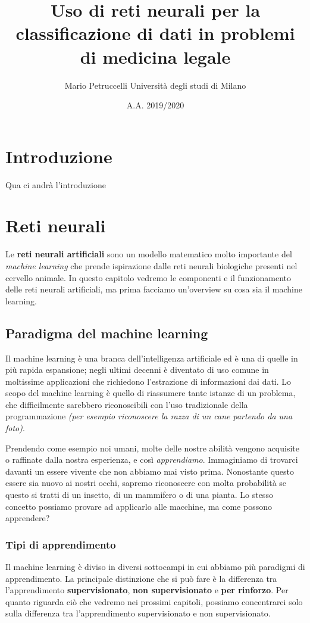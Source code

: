 \documentclass[12pt, twoside, letterpaper]{report}
\title{Uso di reti neurali per la classificazione di dati in problemi di medicina legale}
\author{Mario Petruccelli \cr Università degli studi di Milano}
\date{A.A. 2019/2020}
\begin{document}
	\begin{titlepage}
		
		\newpage
		\tableofcontents
		\thispagestyle{empty}
	\end{titlepage}

	\chapter*{Introduzione}     
		Qua ci andrà l'introduzione

		\newpage		
	\chapter{Reti neurali}
		Le \textbf{reti neurali artificiali} sono un modello matematico molto importante del \textit{machine learning} che prende ispirazione dalle reti neurali biologiche presenti nel cervello animale. In questo capitolo vedremo le componenti e il funzionamento delle reti neurali artificiali, ma prima facciamo un'overview su cosa sia il machine learning.

		\section{Paradigma del machine learning}
			Il machine learning è una branca dell'intelligenza artificiale ed è una di quelle in più rapida espansione; negli ultimi decenni è diventato di uso comune in moltissime applicazioni che richiedono l'estrazione di informazioni dai dati. Lo scopo del machine learning è quello di riassumere tante istanze di un problema, che difficilmente sarebbero riconoscibili con l'uso tradizionale della programmazione \textit{(per esempio riconoscere la razza di un cane partendo da una foto)}.   
			
			Prendendo come esempio noi umani, molte delle nostre abilità vengono acquisite o raffinate dalla nostra esperienza, e così \textit{apprendiamo}. Immaginiamo di trovarci davanti un essere vivente che non abbiamo mai visto prima. Nonostante questo essere sia nuovo ai nostri occhi, sapremo riconoscere con molta probabilità se questo si tratti di un insetto, di un mammifero o di una pianta. Lo stesso concetto possiamo provare ad applicarlo alle macchine, ma come possono apprendere? 
			
			\subsection{Tipi di apprendimento} Il machine learning è diviso in diversi sottocampi in cui abbiamo più paradigmi di apprendimento. La principale distinzione che si può fare è la differenza tra l'apprendimento \textbf{supervisionato}, \textbf{non supervisionato} e \textbf{per rinforzo}. Per quanto riguarda ciò che vedremo nei prossimi capitoli, possiamo concentrarci solo sulla differenza tra l'apprendimento supervisionato e non supervisionato.
			
\end{document}
